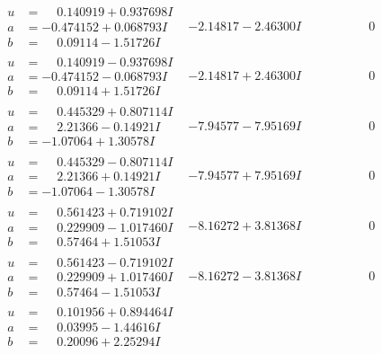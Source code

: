 \documentclass[1p]{elsarticle_modified}
\theoremstyle{definition}
\begin{document}
$$\begin{array}{c|c|c}
\begin{aligned}
u &= \phantom{-}0.140919 + 0.937698 I \\
a &= -0.474152 + 0.068793 I \\
b &= \phantom{-}0.09114 - 1.51726 I\end{aligned}
 & -2.14817 - 2.46300 I & \phantom{-0.000000 } 0 \\ \hline\begin{aligned}
u &= \phantom{-}0.140919 - 0.937698 I \\
a &= -0.474152 - 0.068793 I \\
b &= \phantom{-}0.09114 + 1.51726 I\end{aligned}
 & -2.14817 + 2.46300 I & \phantom{-0.000000 } 0 \\ \hline\begin{aligned}
u &= \phantom{-}0.445329 + 0.807114 I \\
a &= \phantom{-}2.21366 - 0.14921 I \\
b &= -1.07064 + 1.30578 I\end{aligned}
 & -7.94577 - 7.95169 I & \phantom{-0.000000 } 0 \\ \hline\begin{aligned}
u &= \phantom{-}0.445329 - 0.807114 I \\
a &= \phantom{-}2.21366 + 0.14921 I \\
b &= -1.07064 - 1.30578 I\end{aligned}
 & -7.94577 + 7.95169 I & \phantom{-0.000000 } 0 \\ \hline\begin{aligned}
u &= \phantom{-}0.561423 + 0.719102 I \\
a &= \phantom{-}0.229909 - 1.017460 I \\
b &= \phantom{-}0.57464 + 1.51053 I\end{aligned}
 & -8.16272 + 3.81368 I & \phantom{-0.000000 } 0 \\ \hline\begin{aligned}
u &= \phantom{-}0.561423 - 0.719102 I \\
a &= \phantom{-}0.229909 + 1.017460 I \\
b &= \phantom{-}0.57464 - 1.51053 I\end{aligned}
 & -8.16272 - 3.81368 I & \phantom{-0.000000 } 0 \\ \hline\begin{aligned}
u &= \phantom{-}0.101956 + 0.894464 I \\
a &= \phantom{-}0.03995 - 1.44616 I \\
b &= \phantom{-}0.20096 + 2.25294 I\end{aligned}

\end{array}$$
\end{document}
